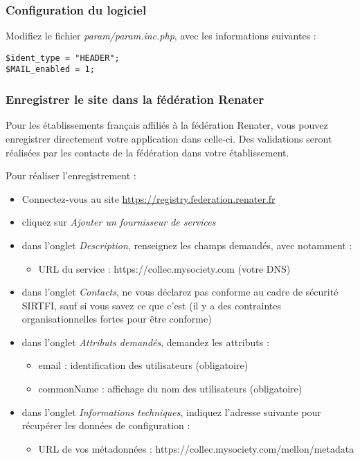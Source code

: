 \subsubsection{Configuration du logiciel}
Modifiez le fichier \textit{param/param.inc.php}, avec les informations suivantes :

\begin{lstlisting}
$ident_type = "HEADER";
$MAIL_enabled = 1;
\end{lstlisting}

\subsubsection{Enregistrer le site dans la fédération Renater}

Pour les établissements français affiliés à la fédération Renater, vous pouvez enregistrer directement votre application dans celle-ci. Des validations seront réalisées par les contacts de la fédération dans votre établissement.

Pour réaliser l'enregistrement :
\begin{itemize}
	\item Connectez-vous au site \href{https://registry.federation.renater.fr}{https://registry.federation.renater.fr}
	\item cliquez sur \textit{Ajouter un fournisseur de services}
	\item  dans l'onglet \textit{Description}, renseignez les champs demandés, avec notamment :
	\begin{itemize}
		\item URL du service : https://collec.mysociety.com (votre DNS)
	\end{itemize}
	\item  dans l'onglet \textit{Contacts}, ne vous déclarez pas conforme au cadre de sécurité SIRTFI, sauf si vous savez ce que c'est (il y a des contraintes organisationnelles fortes pour être conforme)
	\item dans l'onglet \textit{Attributs demandés}, demandez les attributs :
	\begin{itemize}
		\item email : identification des utilisateurs (obligatoire)
		\item commonName : affichage du nom des utilisateurs (obligatoire)
	\end{itemize}
	\item dans l'onglet \textit{Informations techniques}, indiquez l'adresse suivante pour récupérer les données de configuration :
	\begin{itemize}
		\item URL de vos métadonnées : https://collec.mysociety.com/mellon/metadata
	\end{itemize}
\end{itemize}


